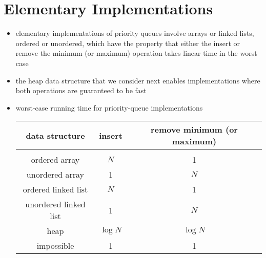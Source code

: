 \documentclass[8pt,a4paper,compress]{beamer}
\begin{document}
\section{Elementary Implementations}
\begin{frame}[fragile]
\begin{itemize}
\item elementary implementations of priority queues involve arrays or linked lists, ordered or unordered, which have the property that either the insert or remove the minimum (or maximum) operation takes linear time in the worst case

\item the heap data structure that we consider next enables implementations where both operations are guaranteed to be fast

\item worst-case running time for priority-queue implementations
\begin{center}
\begin{tabular}{ccc}
\textbf{data structure} & \textbf{insert} & \textbf{remove minimum (or maximum)} \\ \hline \\
ordered array & $N$ & 1 \\
unordered array & 1 & $N$ \\
ordered linked list & $N$ & 1 \\
unordered linked list & 1 & $N$ \\
heap & $\log N$ & $\log N$ \\
impossible & 1 & 1
\end{tabular} 
\end{center}
\end{itemize}
\end{frame}
\end{document}
